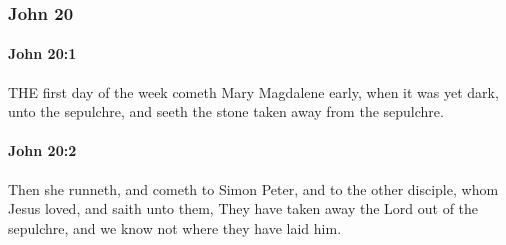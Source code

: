 	\subsubsection{John 20} %
		\label{JOHN-20}
		
		\paragraph{John 20:1} %
			\label{JOHN-20-1}

			THE first day of the week cometh Mary Magdalene early, when it was yet dark, unto the sepulchre, and seeth the stone taken away from the sepulchre.

			\begin{framed}
				\scriptsize
				\begin{compactdesc}
					\item[SBLG] 
				\end{compactdesc}
			\end{framed}

		\paragraph{John 20:2} %
			\label{JOHN-20-2}

			Then she runneth, and cometh to Simon Peter, and to the other disciple, whom Jesus loved, and saith unto them, They have taken away the Lord out of the sepulchre, and we know not where they have laid him.

